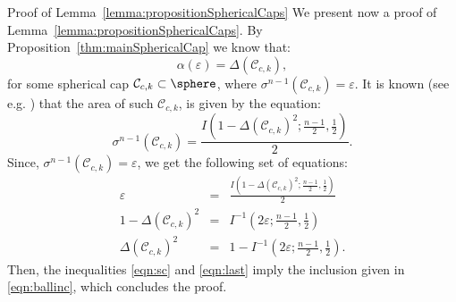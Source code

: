 \begin{section}{Proof of Lemma~\ref{lemma:propositionSphericalCaps}}\label{sec:ProofSphericalCaps}
We present now a proof of Lemma~\ref{lemma:propositionSphericalCaps}. By Proposition~\ref{thm:mainSphericalCap} we know that:
\begin{equation}\label{eqn:sc}
\alpha(\varepsilon) = \Delta(\mathcal{C}_{c, k}),
\end{equation}
for some spherical cap $\mathcal{C}_{c,k} \subset \sphere$, where  $\sigma^{n-1}(\mathcal{C}_{c, k}) = \varepsilon$. It is known (see e.g. \cite{sphericalCapRef}) that the area of such $\mathcal{C}_{c, k}$, is given by the equation:
\begin{equation}\sigma^{n-1}(\mathcal{C}_{c, k}) = \frac{I\left(1-\Delta(\mathcal{C}_{c,k})^2; \frac{n-1}{2}, \frac{1}{2}\right)}{2}.
\end{equation}
Since, \mbox{$\sigma^{n-1}(\mathcal{C}_{c, k})= \varepsilon$,} we get the following set of equations:
\begin{eqnarray}\nonumber \varepsilon &=& \frac{I\left(1- \Delta(\mathcal{C}_{c,k})^2;\frac{n-1}{2}, \frac{1}{2}\right)}{2} \\
\nonumber 1- \Delta(\mathcal{C}_{c, k})^2 &=&  I^{-1}\left(2\varepsilon; \frac{n-1}{2}, \frac{1}{2}\right) \\
\label{eqn:last}\Delta(\mathcal{C}_{c, k})^2 &=&  1- I^{-1}\left(2\varepsilon; \frac{n-1}{2}, \frac{1}{2}\right).
\end{eqnarray}
Then, the inequalities \eqref{eqn:sc} and \eqref{eqn:last} imply the inclusion given in \eqref{eqn:ballinc}, which concludes the proof.


\end{section}


